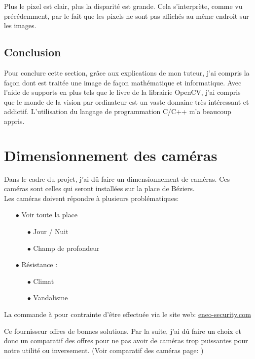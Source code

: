 \documentclass[12pt, french]{report}
\begin{document}
Plus le pixel est clair, plus la disparité est grande. Cela s'interprète, comme vu précédemment, par le fait que les pixels ne sont pas affichés au même endroit sur les images.

\subsection{Conclusion}

Pour conclure cette section, grâce aux explications de mon tuteur, j'ai compris la façon dont est traitée une image de façon mathématique et informatique. Avec l'aide de supports en plus tels que le livre de la librairie OpenCV, j'ai compris que le monde de la vision par ordinateur est un vaste domaine très intéressant et addictif. L'utilisation du langage de programmation C/C++ m'a beaucoup appris.



\newpage
\section{Dimensionnement des caméras}

Dans le cadre du projet, j'ai dû faire un dimensionnement de caméras. Ces caméras sont celles qui seront installées sur la place de Béziers.\\

Les caméras doivent répondre à plusieurs problématiques:
\begin{itemize}
    \item[$\bullet$] Voir toute la place
    \begin{itemize}
        \item[$\bullet$] Jour / Nuit
        \item[$\bullet$] Champ de profondeur
    \end{itemize}
    \item[$\bullet$] Résistance :
    \begin{itemize}
        \item[$\bullet$] Climat
        \item[$\bullet$]Vandalisme
    \end{itemize}
\end{itemize}

La commande à pour contrainte d'être effectuée via le site web: \href{eneo-security.com}{eneo-security.com}\newline

Ce fournisseur offres de bonnes solutions. Par la suite, j'ai dû faire un choix et donc un comparatif des offres pour ne pas avoir de caméras trop puissantes pour notre utilité ou inversement.  (Voir comparatif des caméras page: \pageref{Comparatif.pdf})
\end{document}
